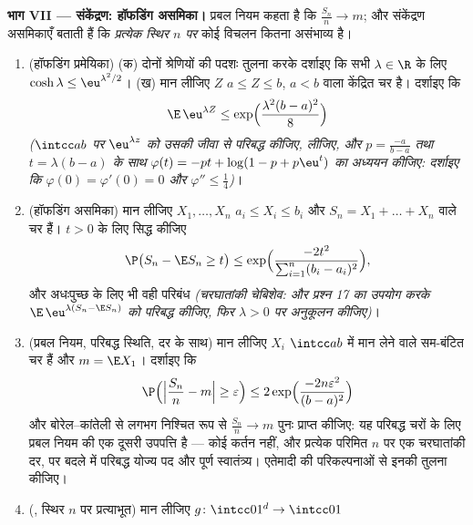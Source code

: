\begin{problem}
\medskip
\noindent\textbf{भाग VII --- संकेंद्रण: हॉफडिंग असमिका।} प्रबल
नियम कहता है कि $\frac{S_n}n \to m$; और संकेंद्रण असमिकाएँ बताती हैं कि
\emph{प्रत्येक स्थिर $n$ पर} कोई विचलन कितना असंभाव्य है।
\begin{enumerate}[resume]
  \item (हॉफडिंग प्रमेयिका)
        (क) दोनों श्रेणियों की पदशः तुलना करके दर्शाइए कि सभी
        $\lambda \in \R$ के लिए $\cosh\lambda \leq \eu^{\lambda^2/2}$।
        (ख) मान लीजिए $Z$ $a \leq Z \leq b$, $a < b$ वाला केंद्रित चर है।
        दर्शाइए कि
        \[
        \E\,\eu^{\lambda Z} \leq
        \exp\Bigl(\frac{\lambda^2(b - a)^2}8\Bigr)
        \]
        \emph{($\intcc ab$ पर $\eu^{\lambda z}$ को उसकी जीवा से परिबद्ध कीजिए,
         लीजिए, और $p =
        \frac{-a}{b-a}$ तथा $t = \lambda(b - a)$ के साथ $\varphi(t)
        = -pt + \log(1 - p + p\eu^t)$ का अध्ययन
        कीजिए: दर्शाइए कि $\varphi(0) = \varphi'(0) = 0$ और $\varphi''
        \leq \frac14$)}।
  \item (हॉफडिंग असमिका) मान लीजिए $X_1, \dots, X_n$ $a_i \leq X_i \leq b_i$ और $S_n =
        X_1 + \dots + X_n$ वाले
         चर हैं। $t > 0$ के लिए सिद्ध कीजिए
        \[
        \P\bigl(S_n - \E S_n \geq t\bigr) \leq
        \exp\Bigl(\frac{-2t^2}{\sum_{i=1}^n(b_i -
        a_i)^2}\Bigr),
        \]
        और अधःपुच्छ के लिए भी वही परिबंध \emph{(चरघातांकी चेबिशेव:
         और प्रश्न 17 का उपयोग करके $\E\,\eu^{\lambda(S_n - \E S_n)}$ को परिबद्ध
        कीजिए, फिर $\lambda > 0$ पर अनुकूलन कीजिए)}।
  \item (प्रबल नियम, परिबद्ध स्थिति, दर के साथ) मान लीजिए $X_i$
        $\intcc ab$ में मान लेने वाले  सम-बंटित चर हैं और $m
        = \E X_1$।
        दर्शाइए कि
        \[
        \P\Bigl(\Bigl|\frac{S_n}n - m\Bigr| \geq
        \varepsilon\Bigr) \leq
        2\exp\Bigl(\frac{-2n\varepsilon^2}{(b - a)^2}\Bigr)
        \]
        और बोरेल--कांतेली से लगभग निश्चित रूप से $\frac{S_n}n \to m$ पुनः प्राप्त
        कीजिए: यह परिबद्ध चरों के लिए प्रबल नियम की एक दूसरी
        उपपत्ति है --- कोई कर्तन नहीं, और प्रत्येक परिमित $n$ पर
        एक चरघातांकी दर, पर बदले में परिबद्ध योज्य पद और पूर्ण
        स्वातंत्र्य। एतेमादी की परिकल्पनाओं से इनकी तुलना कीजिए।
  \item (, स्थिर $n$ पर प्रत्याभूत) मान लीजिए $g
        \colon \intcc01^d \to \intcc01$

\end{enumerate}
\end{problem}

